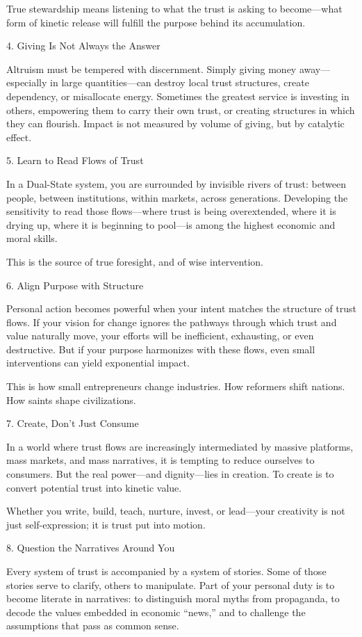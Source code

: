 \documentclass[11pt,oneside]{book}
\begin{document}
True stewardship means listening to what the trust is asking to become—what form of kinetic release will fulfill the purpose behind its accumulation.

4. Giving Is Not Always the Answer


Altruism must be tempered with discernment. Simply giving money away—especially in large quantities—can destroy local trust structures, create dependency, or misallocate energy. Sometimes the greatest service is investing in others, empowering them to carry their own trust, or creating structures in which they can flourish. Impact is not measured by volume of giving, but by catalytic effect.

5. Learn to Read Flows of Trust


In a Dual-State system, you are surrounded by invisible rivers of trust: between people, between institutions, within markets, across generations. Developing the sensitivity to read those flows—where trust is being overextended, where it is drying up, where it is beginning to pool—is among the highest economic and moral skills.

This is the source of true foresight, and of wise intervention.

6. Align Purpose with Structure


Personal action becomes powerful when your intent matches the structure of trust flows. If your vision for change ignores the pathways through which trust and value naturally move, your efforts will be inefficient, exhausting, or even destructive. But if your purpose harmonizes with these flows, even small interventions can yield exponential impact.

This is how small entrepreneurs change industries. How reformers shift nations. How saints shape civilizations.

7. Create, Don’t Just Consume


In a world where trust flows are increasingly intermediated by massive platforms, mass markets, and mass narratives, it is tempting to reduce ourselves to consumers. But the real power—and dignity—lies in creation. To create is to convert potential trust into kinetic value.

Whether you write, build, teach, nurture, invest, or lead—your creativity is not just self-expression; it is trust put into motion.

8. Question the Narratives Around You


Every system of trust is accompanied by a system of stories. Some of those stories serve to clarify, others to manipulate. Part of your personal duty is to become literate in narratives: to distinguish moral myths from propaganda, to decode the values embedded in economic “news,” and to challenge the assumptions that pass as common sense.
\end{document}
